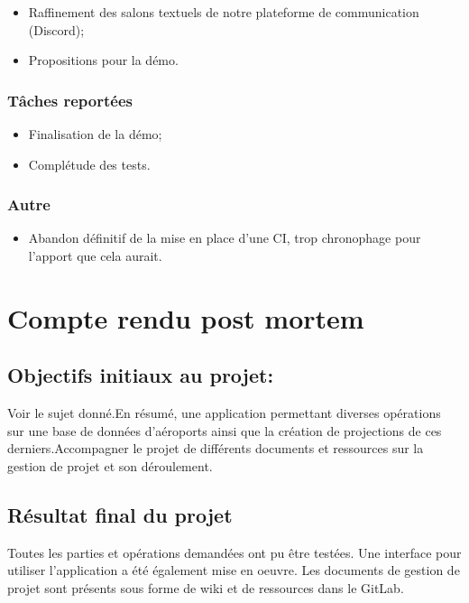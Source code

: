 \documentclass[a4paper, 12pt]{report}
\begin{document}
\begin{itemize}

\item
  Raffinement des salons textuels de notre plateforme de communication
  (Discord);
\item
  Propositions pour la démo.
\end{itemize}

\subsubsection*{Tâches reportées}

\begin{itemize}

\item
  Finalisation de la démo;
\item
  Complétude des tests.
\end{itemize}

\subsubsection{Autre}

\begin{itemize}

\item
  Abandon définitif de la mise en place d'une CI, trop chronophage pour
  l'apport que cela aurait.
\end{itemize}


\section{Compte rendu post mortem}

\subsection*{Objectifs initiaux au projet:}
 Voir le sujet donné.En résumé, une application permettant diverses opérations sur une base de données d'aéroports ainsi que la création de projections de ces derniers.Accompagner le projet de différents documents et ressources sur la gestion de projet et son déroulement.
 
\subsection*{Résultat final du projet}
Toutes les parties et opérations demandées ont pu être testées.
Une interface pour utiliser l'application a été également mise en oeuvre.
Les documents de gestion de projet sont présents sous forme de wiki et de ressources dans le GitLab.
\end{document}
